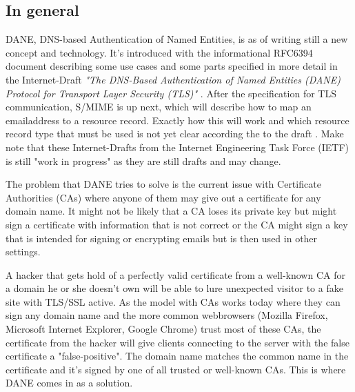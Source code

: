 \subsection{In general}
DANE, DNS-based Authentication of Named Entities, is as of writing still a new concept and technology.
It's introduced with the informational RFC6394 document \cite{rfc:6394} describing some use cases and some parts specified in more detail in the Internet-Draft \emph{"The DNS-Based Authentication of Named Entities (DANE) Protocol for Transport Layer Security (TLS)"} \cite{rfc:draft-dane}.
After the specification for TLS communication, S/MIME is up next, which will describe how to map an emailaddress to a resource record.
Exactly how this will work and which resource record type that must be used is not yet clear according the to the draft \cite{rfc:draft-smime}.
Make note that these Internet-Drafts from the Internet Engineering Task Force (IETF) is still "work in progress" as they are still drafts and may change.

The problem that DANE tries to solve is the current issue with Certificate Authorities (CAs) where anyone of them may give out a certificate for any domain name.
It might not be likely that a CA loses its private key but might sign a certificate with information that is not correct or the CA might sign a key that is intended for signing or encrypting emails but is then used in other settings.

A hacker that gets hold of a perfectly valid certificate from a well-known CA for a domain he or she doesn't own will be able to lure unexpected visitor to a fake site with TLS/SSL active.
As the model with CAs works today where they can sign any domain name and the more common webbrowsers (Mozilla Firefox, Microsoft Internet Explorer, Google Chrome) trust most of these CAs, the certificate from the hacker will give clients connecting to the server with the false certificate a "false-positive".
The domain name matches the common name in the certificate and it's signed by one of all trusted or well-known CAs.
This is where DANE comes in as a solution.

